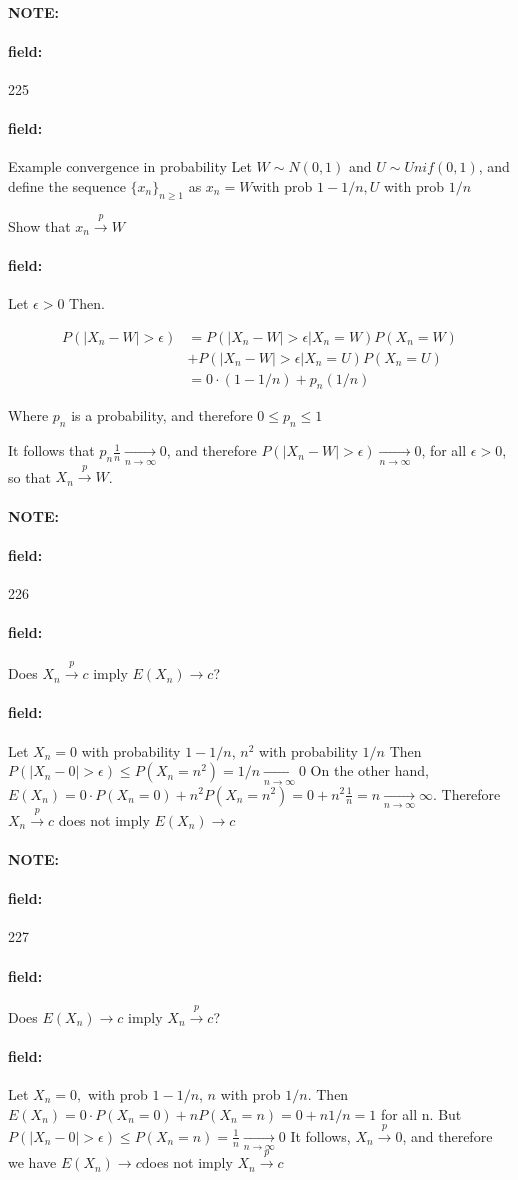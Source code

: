 \documentclass[12pt]{article}
\newenvironment{note}{\paragraph{NOTE:}}{}
\newenvironment{field}{\paragraph{field:}}{}
\begin{document}
\begin{note} \begin{field} \tiny 225 \end{field}
  \begin{field}
    Example convergence in probability
    Let $W \sim N(0,1)$ and $U \sim Unif(0,1)$, and define the sequence $\{x_n\}_{n \geq 1}$ as $x_n = W $with prob $1 - 1/n, U$ with prob $ 1/n$

    Show that $x_n \overset{p}{\to} W $

  \end{field}
  \begin{field}
    Let $\epsilon > 0$ Then.

    \begin{align*}
      P(|X_n - W| > \epsilon) &= P(|X_n - W| > \epsilon | X_n = W)P(X_n = W) \\
      &+ P(|X_n - W| > \epsilon | X_n = U)P(X_n = U)\\
      &= 0 \cdot (1 - 1/n) + p_n (1/n)
    \end{align*}

    Where $p_n  $ is a probability, and therefore $0 \leq p_n \leq 1 $

    It follows that $p_n \frac{1}{n} \underset{n \to \infty}{\to} 0$, and therefore $P(|X_n - W| > \epsilon ) \underset{n \to \infty}{\to} 0$, for all $\epsilon > 0$, so that $X_n \overset{p}{\to} W$.
  \end{field}
\end{note}

\begin{note} \begin{field} \tiny 226 \end{field}
  \begin{field}
    Does $X_n \overset{p}{\to} c$ imply $E(X_n) \to c $?
  \end{field}
  \begin{field}
    Let $X_n = 0$ with probability $1 - 1/n$, $n^2 $ with probability $1/n$
    Then $P(|X_n - 0| > \epsilon) \leq P(X_n = n^2) = 1/n \underset{n \to \infty}{\to} 0$
    On the other hand,
    $E(X_n) = 0 \cdot P(X_n =0) + n^2P(X_n = n^2) = 0 + n^2 \frac{1}{n} = n \underset{n \to \infty}{\to} \infty$.
    Therefore $X_n \overset{p}{\to} c$ does not imply $E(X_n) \to c $
  \end{field}
\end{note}

\begin{note} \begin{field} \tiny 227 \end{field}
  \begin{field}
    Does $E(X_n) \to c $ imply $X_n \overset{p}{\to}c$?
  \end{field}
  \begin{field}
    Let $X_n = 0, $ with prob $1 - 1/n$, $n$ with prob $1/n$.
    Then $E(X_n) = 0 \cdot P(X_n = 0) + n P(X_n = n) = 0  + n 1/n = 1$ for all n.
    But $P(|X_n - 0| > \epsilon) \leq P(X_n = n) = \frac{1}{n } \underset{n \to \infty}{\to} 0$
    It follows, $X_n \overset{p}{\to} 0 $, and therefore we have $E(X_n) \to c $does not imply $X_n \overset{p}{\to}c$
  \end{field}
\end{note}
\end{document}
